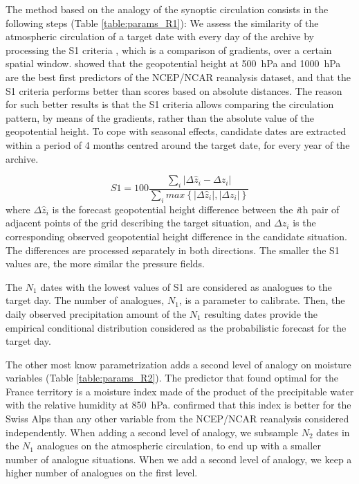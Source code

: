 \documentclass[twocol]{ametsoc}
\begin{document}
The method based on the analogy of the synoptic circulation consists in the following steps (Table \ref{table:params_R1}): We assess the similarity of the atmospheric circulation of a target date with every day of the archive by processing the S1 criteria \citep[Eq.\ (\ref{eq:S1}), ][]{Teweles1954, Drosdowsky2003}, which is a comparison of gradients, over a certain spatial window. \citet{Bontron2005} showed that the geopotential height at 500~hPa and 1000~hPa are the best first predictors of the NCEP/NCAR reanalysis dataset, and that the S1 criteria performs better than scores based on absolute distances. The reason for such better results is that the S1 criteria allows comparing the circulation pattern, by means of the gradients, rather than the absolute value of the geopotential height. To cope with seasonal effects, candidate dates are extracted within a period of 4 months centred around the target date, for every year of the archive.

\begin{equation}
\label{eq:S1}
S1=100 \frac {\displaystyle \sum_{i} \vert \Delta\hat{z}_{i} - \Delta z_{i} \vert}
{\displaystyle \sum_{i} max\left\lbrace \vert \Delta\hat{z}_{i} \vert , \vert \Delta z_{i} \vert \right\rbrace }
\end{equation}
where $\Delta \hat{z}_{i}$ is the forecast geopotential height difference between the \textit{i}th pair of adjacent points of the grid describing the target situation, and $\Delta z_{i}$ is the corresponding observed geopotential height difference in the candidate situation. The differences are processed separately in both directions. The smaller the S1 values are, the more similar the pressure fields.

The $N_{1}$ dates with the lowest values of S1 are considered as analogues to the target day. The number of analogues, $N_{1}$, is a parameter to calibrate. Then, the daily observed precipitation amount of the $N_{1}$ resulting dates provide the empirical conditional distribution considered as the probabilistic forecast for the target day.

The other most know parametrization adds a second level of analogy on moisture variables (Table \ref{table:params_R2}). The predictor that \citet{Bontron2004} found optimal for the France territory is a moisture index made of the product of the precipitable water with the relative humidity at 850~hPa. \cite{Horton2012a} confirmed that this index is better for the Swiss Alps than any other variable from the NCEP/NCAR reanalysis considered independently. When adding a second level of analogy, we subsample $N_{2}$ dates in the $N_{1}$ analogues on the atmospheric circulation, to end up with a smaller number of analogue situations. When we add a second level of analogy, we keep a higher number of analogues on the first level.
\end{document}

